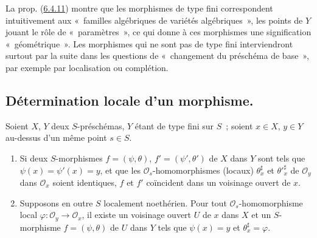 \begin{env}[6.4.13]
\label{I.6.4.13-fr}
La prop. (\hyperref[I.6.4.11-fr]{6.4.11}) montre que les morphismes de type
fini correspondent intuitivement aux «~familles algébriques de variétés
algébriques~», les points de $Y$ jouant
le rôle de «~paramètres~», ce qui donne à ces morphismes une signification
«~géométrique~». Les morphismes qui ne sont pas de type fini interviendront
surtout par la suite dans les questions de «~changement du préschéma de
base~», par exemple par localisation ou complétion.
\end{env}

\subsection{Détermination locale d'un morphisme.}
\label{subsection:I.6.5-fr}

\begin{proposition}[6.5.1]
\label{I.6.5.1-fr}
Soient $X$, $Y$ deux $S$-préschémas, $Y$ étant de type fini sur $S$~; soient
$x\in X$, $y\in Y$ au-dessus d'un même point $s\in S$.
\begin{enumerate}
  \item[\textup{(i)}] Si deux $S$-morphismes $f=(\psi,\theta)$,
    $f'=(\psi',\theta')$ de $X$ dans $Y$ sont tels que
    $\psi(x)=\psi'(x)=y$, et que les $\mathscr{O}_s$-homomorphismes (locaux)
    $\theta_x^\sharp$ et ${\theta'}_x^\sharp$ de $\mathscr{O}_y$ dans
    $\mathscr{O}_x$ soient identiques, $f$ et $f'$ coïncident dans un
    voisinage ouvert de $x$.
  \item[\textup{(ii)}] Supposons en outre $S$ localement noethérien. Pour tout
    $\mathscr{O}_s$-homomorphisme local
    $\varphi:\mathscr{O}_y\to\mathscr{O}_x$, il existe un voisinage ouvert
    $U$ de $x$ dans $X$ et un $S$-morphisme $f=(\psi,\theta)$ de $U$ dans $Y$
    tels que $\psi(x)=y$ et $\theta_x^\sharp=\varphi$.
\end{enumerate}
\end{proposition}

